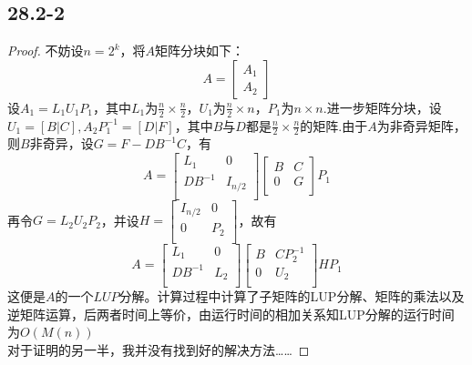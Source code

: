 \documentclass[twocolumn]{article}
\newenvironment{SChinese}{%
	\CJKfamily{gbsn}%
	\CJKtilde
	\CJKnospace}{}
\begin{document}
\begin{CJK}{UTF8}{}
\begin{SChinese}
			\section*{28.2-2}
				\begin{proof}
					不妨设$n=2^k$，将$A$矩阵分块如下：\begin{displaymath}
						A = \left [\begin{matrix}
						A_1 \\ A_2
						\end{matrix}\right]
					\end{displaymath}
					设$A_1 = L_1U_1P_1$，其中$L_1$为$\frac{n}{2}\times\frac{n}{2}$，$U_1$为$\frac{n}{2}\times n$，$P_1$为$n\times n$.进一步矩阵分块，设$U_1=[B|C],A_2P_1^{-1}=[D|F]$，其中$B$与$D$都是$\frac{n}{2}\times\frac{n}{2}$的矩阵.由于$A$为非奇异矩阵，则$B$非奇异，设$G=F-DB^{-1}C$，有\begin{displaymath}
						A = \left [\begin{matrix}
						L_1 & 0 \\
						DB^{-1} & I_{n/2} \\
						\end{matrix}\right]\left [\begin{matrix}
						B & C \\
						0 & G \\
						\end{matrix}\right]P_1
					\end{displaymath}
					再令$G=L_2U_2P_2$，并设$H=\left [\begin{matrix}
					I_{n/2} & 0 \\
					0 & P_2 \\
					\end{matrix}\right]$，故有\begin{displaymath}
						A = \left [\begin{matrix}
						L_1 & 0 \\
						DB^{-1} & L_2 \\
						\end{matrix}\right]\left [\begin{matrix}
						B & CP_2^{-1} \\
						0 & U_2 \\
						\end{matrix}\right]HP_1
					\end{displaymath}
					这便是$A$的一个$LUP$分解。计算过程中计算了子矩阵的LUP分解、矩阵的乘法以及逆矩阵运算，后两者时间上等价，由运行时间的相加关系知LUP分解的运行时间为$O(M(n))$\\
					对于证明的另一半，我并没有找到好的解决方法……
				\end{proof}

\end{SChinese}
\end{CJK}
\end{document}
